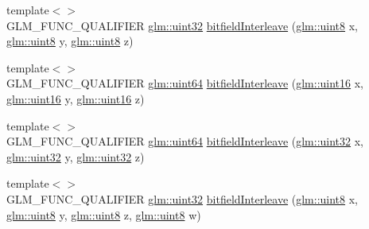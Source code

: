 \begin{DoxyCompactItemize}
\item 
{\footnotesize template$<$$>$ }\\G\+L\+M\+\_\+\+F\+U\+N\+C\+\_\+\+Q\+U\+A\+L\+I\+F\+I\+E\+R \hyperlink{group__gtc__type__precision_ga202b6a53c105fcb7e531f9b443518451}{glm\+::uint32} \hyperlink{namespaceglm_1_1detail_a27e9c62ce3ad180236573daec6a6461f}{bitfield\+Interleave} (\hyperlink{group__gtc__type__precision_ga1a7dcd8aac97cc8020817c94049deff2}{glm\+::uint8} x, \hyperlink{group__gtc__type__precision_ga1a7dcd8aac97cc8020817c94049deff2}{glm\+::uint8} y, \hyperlink{group__gtc__type__precision_ga1a7dcd8aac97cc8020817c94049deff2}{glm\+::uint8} z)
\item 
{\footnotesize template$<$$>$ }\\G\+L\+M\+\_\+\+F\+U\+N\+C\+\_\+\+Q\+U\+A\+L\+I\+F\+I\+E\+R \hyperlink{group__gtc__type__precision_gae3632bf9b37da66233d78930dd06378a}{glm\+::uint64} \hyperlink{namespaceglm_1_1detail_aceed48a30e6dc4f2c64945a60369d73d}{bitfield\+Interleave} (\hyperlink{group__gtc__type__precision_gad8c2939e1fdd8e5828b31d95c52255d5}{glm\+::uint16} x, \hyperlink{group__gtc__type__precision_gad8c2939e1fdd8e5828b31d95c52255d5}{glm\+::uint16} y, \hyperlink{group__gtc__type__precision_gad8c2939e1fdd8e5828b31d95c52255d5}{glm\+::uint16} z)
\item 
{\footnotesize template$<$$>$ }\\G\+L\+M\+\_\+\+F\+U\+N\+C\+\_\+\+Q\+U\+A\+L\+I\+F\+I\+E\+R \hyperlink{group__gtc__type__precision_gae3632bf9b37da66233d78930dd06378a}{glm\+::uint64} \hyperlink{namespaceglm_1_1detail_a7f6421e0b1180ec986fd91d8eb2d1cc9}{bitfield\+Interleave} (\hyperlink{group__gtc__type__precision_ga202b6a53c105fcb7e531f9b443518451}{glm\+::uint32} x, \hyperlink{group__gtc__type__precision_ga202b6a53c105fcb7e531f9b443518451}{glm\+::uint32} y, \hyperlink{group__gtc__type__precision_ga202b6a53c105fcb7e531f9b443518451}{glm\+::uint32} z)
\item 
{\footnotesize template$<$$>$ }\\G\+L\+M\+\_\+\+F\+U\+N\+C\+\_\+\+Q\+U\+A\+L\+I\+F\+I\+E\+R \hyperlink{group__gtc__type__precision_ga202b6a53c105fcb7e531f9b443518451}{glm\+::uint32} \hyperlink{namespaceglm_1_1detail_ae3f57ec9a2b938eb31978ccb99f85474}{bitfield\+Interleave} (\hyperlink{group__gtc__type__precision_ga1a7dcd8aac97cc8020817c94049deff2}{glm\+::uint8} x, \hyperlink{group__gtc__type__precision_ga1a7dcd8aac97cc8020817c94049deff2}{glm\+::uint8} y, \hyperlink{group__gtc__type__precision_ga1a7dcd8aac97cc8020817c94049deff2}{glm\+::uint8} z, \hyperlink{group__gtc__type__precision_ga1a7dcd8aac97cc8020817c94049deff2}{glm\+::uint8} w)

\end{DoxyCompactItemize}
